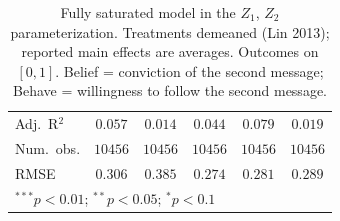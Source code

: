 \begin{table}
\begin{center}
\begin{tabular}{l c c || c c || c}
Adj.\ R$^2$                              & $0.057$       & $0.014$       & $0.044$       & $0.079$       & $0.019$       \\
Num.\ obs.                               & $10456$       & $10456$       & $10456$       & $10456$       & $10456$       \\
RMSE                                     & $0.306$       & $0.385$       & $0.274$       & $0.281$       & $0.289$       \\
\hline
\multicolumn{6}{l}{\scriptsize{$^{***}p<0.01$; $^{**}p<0.05$; $^{*}p<0.1$}}
\end{tabular}
\caption{Fully saturated model in the $Z_1$, $Z_2$ parameterization. Treatments demeaned (Lin 2013); reported main effects are averages. Outcomes on $[0,1]$. Belief = conviction of the second message; Behave = willingness to follow the second message.}
\label{table:mixed}
\end{center}
\end{table}

